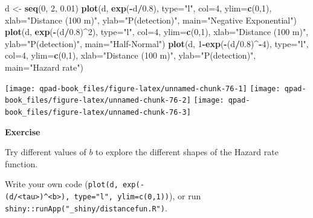 \documentclass[12pt,]{book}
\newenvironment{Shaded}{\begin{snugshade}}{\end{snugshade}}
\newcommand{\DataTypeTok}[1]{\textcolor[rgb]{0.13,0.29,0.53}{#1}}
\newcommand{\DecValTok}[1]{\textcolor[rgb]{0.00,0.00,0.81}{#1}}
\newcommand{\FloatTok}[1]{\textcolor[rgb]{0.00,0.00,0.81}{#1}}
\newcommand{\KeywordTok}[1]{\textcolor[rgb]{0.13,0.29,0.53}{\textbf{#1}}}
\newcommand{\NormalTok}[1]{#1}
\newcommand{\OperatorTok}[1]{\textcolor[rgb]{0.81,0.36,0.00}{\textbf{#1}}}
\newcommand{\StringTok}[1]{\textcolor[rgb]{0.31,0.60,0.02}{#1}}
\let\BeginKnitrBlock\begin \let\EndKnitrBlock\end
\begin{document}
\begin{Shaded}
\begin{Highlighting}[]
\NormalTok{d <-}\StringTok{ }\KeywordTok{seq}\NormalTok{(}\DecValTok{0}\NormalTok{, }\DecValTok{2}\NormalTok{, }\FloatTok{0.01}\NormalTok{)}
\KeywordTok{plot}\NormalTok{(d, }\KeywordTok{exp}\NormalTok{(}\OperatorTok{-}\NormalTok{d}\OperatorTok{/}\FloatTok{0.8}\NormalTok{), }\DataTypeTok{type=}\StringTok{"l"}\NormalTok{, }\DataTypeTok{col=}\DecValTok{4}\NormalTok{, }\DataTypeTok{ylim=}\KeywordTok{c}\NormalTok{(}\DecValTok{0}\NormalTok{,}\DecValTok{1}\NormalTok{),}
  \DataTypeTok{xlab=}\StringTok{"Distance (100 m)"}\NormalTok{, }\DataTypeTok{ylab=}\StringTok{"P(detection)"}\NormalTok{, }\DataTypeTok{main=}\StringTok{"Negative Exponential"}\NormalTok{)}
\KeywordTok{plot}\NormalTok{(d, }\KeywordTok{exp}\NormalTok{(}\OperatorTok{-}\NormalTok{(d}\OperatorTok{/}\FloatTok{0.8}\NormalTok{)}\OperatorTok{^}\DecValTok{2}\NormalTok{), }\DataTypeTok{type=}\StringTok{"l"}\NormalTok{, }\DataTypeTok{col=}\DecValTok{4}\NormalTok{, }\DataTypeTok{ylim=}\KeywordTok{c}\NormalTok{(}\DecValTok{0}\NormalTok{,}\DecValTok{1}\NormalTok{),}
  \DataTypeTok{xlab=}\StringTok{"Distance (100 m)"}\NormalTok{, }\DataTypeTok{ylab=}\StringTok{"P(detection)"}\NormalTok{, }\DataTypeTok{main=}\StringTok{"Half-Normal"}\NormalTok{)}
\KeywordTok{plot}\NormalTok{(d, }\DecValTok{1}\OperatorTok{-}\KeywordTok{exp}\NormalTok{(}\OperatorTok{-}\NormalTok{(d}\OperatorTok{/}\FloatTok{0.8}\NormalTok{)}\OperatorTok{^-}\DecValTok{4}\NormalTok{), }\DataTypeTok{type=}\StringTok{"l"}\NormalTok{, }\DataTypeTok{col=}\DecValTok{4}\NormalTok{, }\DataTypeTok{ylim=}\KeywordTok{c}\NormalTok{(}\DecValTok{0}\NormalTok{,}\DecValTok{1}\NormalTok{),}
  \DataTypeTok{xlab=}\StringTok{"Distance (100 m)"}\NormalTok{, }\DataTypeTok{ylab=}\StringTok{"P(detection)"}\NormalTok{, }\DataTypeTok{main=}\StringTok{"Hazard rate"}\NormalTok{)}
\end{Highlighting}
\end{Shaded}

\texttt{[image: qpad-book\_files/figure-latex/unnamed-chunk-76-1]} \texttt{[image: qpad-book\_files/figure-latex/unnamed-chunk-76-2]} \texttt{[image: qpad-book\_files/figure-latex/unnamed-chunk-76-3]}

\BeginKnitrBlock{rmdexercise}
\textbf{Exercise}

Try different values of \(b\) to explore the different shapes of the Hazard rate function.

Write your own code (\texttt{plot(d,\ exp(-(d/\textless{}tau\textgreater{})\^{}\textless{}b\textgreater{}),\ type="l",\ ylim=c(0,1))}), or run \texttt{shiny::runApp("\_shiny/distancefun.R")}.
\EndKnitrBlock{rmdexercise}
\end{document}
